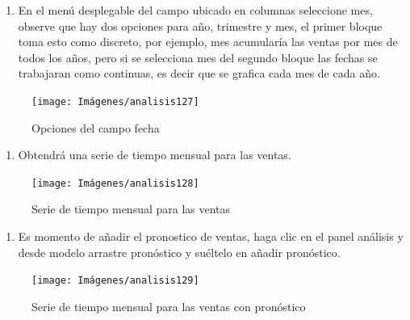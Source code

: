\documentclass[
]{book}
\providecommand{\tightlist}{%
  \setlength{\itemsep}{0pt}\setlength{\parskip}{0pt}}
\begin{document}
\begin{enumerate}
\def\labelenumi{\arabic{enumi}.}
\setcounter{enumi}{2}
\tightlist
\item
  En el menú desplegable del campo ubicado en columnas seleccione mes, observe que hay dos opciones para año, trimestre y mes, el primer bloque toma esto como discreto, por ejemplo, mes acumularía las ventas por mes de todos los años, pero si se selecciona mes del segundo bloque las fechas se trabajaran como continuas, es decir que se grafica cada mes de cada año.
\end{enumerate}

\begin{figure}

{\centering \texttt{[image: Imágenes/analisis127]} 

}

\caption{Opciones del campo fecha}\label{fig:paso3pronosticos-fig}
\end{figure}

\begin{enumerate}
\def\labelenumi{\arabic{enumi}.}
\setcounter{enumi}{3}
\tightlist
\item
  Obtendrá una serie de tiempo mensual para las ventas.
\end{enumerate}

\begin{figure}

{\centering \texttt{[image: Imágenes/analisis128]} 

}

\caption{Serie de tiempo mensual para las ventas}\label{fig:paso4pronosticos-fig}
\end{figure}

\begin{enumerate}
\def\labelenumi{\arabic{enumi}.}
\setcounter{enumi}{4}
\tightlist
\item
  Es momento de añadir el pronostico de ventas, haga clic en el panel análisis y desde modelo arrastre pronóstico y suéltelo en añadir pronóstico.
\end{enumerate}

\begin{figure}

{\centering \texttt{[image: Imágenes/analisis129]} 

}

\caption{Serie de tiempo mensual para las ventas con pronóstico}\label{fig:paso5pronosticos-fig}
\end{figure}
\end{document}
